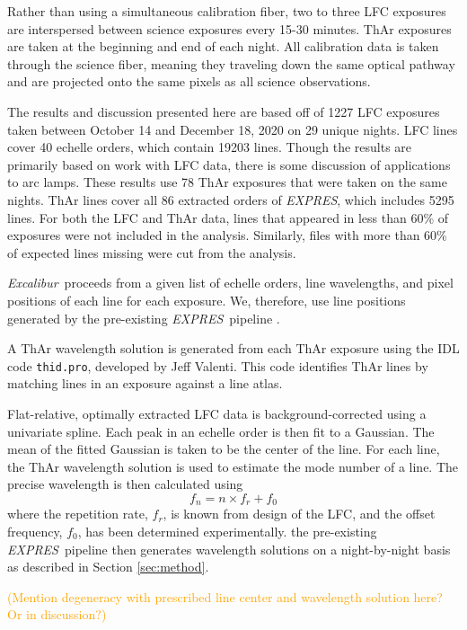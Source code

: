 \documentclass[12pt, onecolumn]{aastex63}
\newcommand{\lz}[1]{\textcolor{orange}{#1}}
\newcommand{\project}[1]{\textsl{#1}}
\newcommand{\name}{\project{Excalibur}}
\newcommand{\acronym}[1]{{\small{#1}}}
\newcommand{\expres}{\project{\acronym{EXPRES}}}
\begin{document}
Rather than using a simultaneous calibration fiber, two to three LFC exposures are interspersed between science exposures every 15-30 minutes.  ThAr exposures are taken at the beginning and end of each night.  All calibration data is taken through the science fiber, meaning they traveling down the same optical pathway and are projected onto the same pixels as all science observations.

The results and discussion presented here are based off of 1227 LFC exposures taken between October 14 and December 18, 2020 on 29 unique nights.  LFC lines cover 40 echelle orders, which contain 19203 lines.  Though the results are primarily based on work with LFC data, there is some discussion of applications to arc lamps.  These results use 78 ThAr exposures that were taken on the same nights.  ThAr lines cover all 86 extracted orders of \expres, which includes 5295 lines.  For both the LFC and ThAr data, lines that appeared in less than 60\% of exposures were not included in the analysis.  Similarly, files with more than 60\% of expected lines missing were cut from the analysis.  

 \name\ proceeds from a given list of echelle orders, line wavelengths, and pixel positions of each line for each exposure.  We, therefore, use line positions generated by the pre-existing \expres\ pipeline \citep{petersburg2020}.
 
 A ThAr wavelength solution is generated from each ThAr exposure using the IDL code \texttt{thid.pro}, developed by Jeff Valenti.  This code identifies ThAr lines by matching lines in an exposure against a line atlas. 
 
 Flat-relative, optimally extracted LFC data is background-corrected using a univariate spline.  Each peak in an echelle order is then fit to a Gaussian.  The mean of the fitted Gaussian is taken to be the center of the line.  For each line, the ThAr wavelength solution is used to estimate the mode number of a line.  The precise wavelength is then calculated using
 \begin{equation}
 f_n = n \times  f_r + f_0
 \label{eq:lfc}
 \end{equation}
 where the repetition rate, $f_r$, is known from design of the LFC, and the offset frequency, $f_0$, has been determined experimentally.  the pre-existing \expres\ pipeline then generates wavelength solutions on a night-by-night basis as described in Section \ref{sec:method}.
 
 \lz{(Mention degeneracy with prescribed line center and wavelength solution here?  Or in discussion?)}
 
\end{document}
